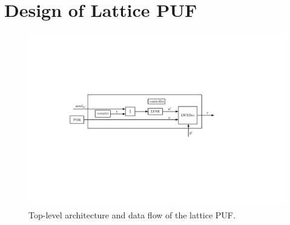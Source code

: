\section{Design of Lattice PUF}
\label{sec:design}
\begin{figure}[t!]
    \centering
    \includegraphics[width = 1.0\linewidth]{./figs/top_level_arch.pdf}    \caption{Top-level architecture and data flow of the lattice PUF.}
    \label{fig:fpga_impl}
\end{figure}

